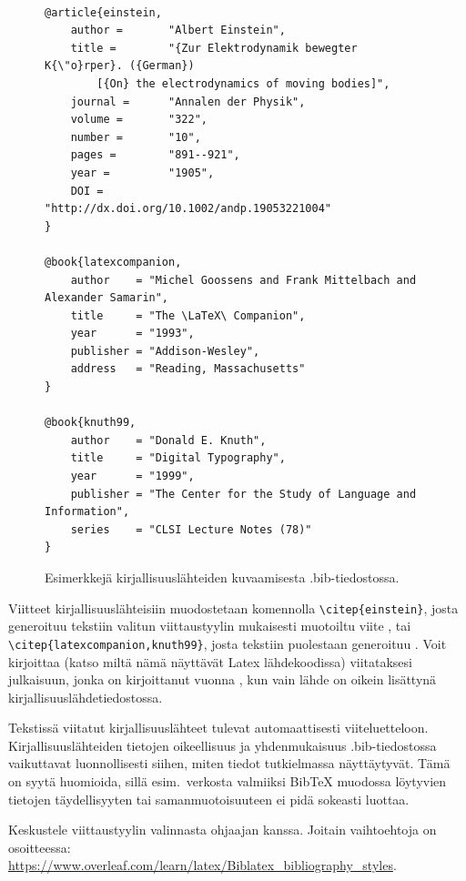 \begin{figure}[ht]
    \centering
    \begin{scriptsize}
\begin{verbatim}

@article{einstein,
    author =       "Albert Einstein",
    title =        "{Zur Elektrodynamik bewegter K{\"o}rper}. ({German})
        [{On} the electrodynamics of moving bodies]",
    journal =      "Annalen der Physik",
    volume =       "322",
    number =       "10",
    pages =        "891--921",
    year =         "1905",
    DOI =          "http://dx.doi.org/10.1002/andp.19053221004"
}

@book{latexcompanion,
    author    = "Michel Goossens and Frank Mittelbach and Alexander Samarin",
    title     = "The \LaTeX\ Companion",
    year      = "1993",
    publisher = "Addison-Wesley",
    address   = "Reading, Massachusetts"
}

@book{knuth99,
    author    = "Donald E. Knuth",
    title     = "Digital Typography",
    year      = "1999",
    publisher = "The Center for the Study of Language and Information",
    series    = "CLSI Lecture Notes (78)"
}
\end{verbatim}
\end{scriptsize}
    \caption{Esimerkkejä kirjallisuuslähteiden kuvaamisesta .bib-tiedostossa.}
    \label{bibexamples-fi}
\end{figure}

Viitteet kirjallisuuslähteisiin muodostetaan komennolla \texttt{\textbackslash citep\{einstein\}}, josta generoituu tekstiin valitun viittaustyylin mukaisesti muotoiltu viite \citep{einstein}, tai \texttt{\textbackslash citep\{latexcompanion,knuth99\}}, josta tekstiin puolestaan generoituu \citep{latexcompanion,knuth99}. 
Voit kirjoittaa (katso miltä nämä näyttävät Latex lähdekoodissa) \citep{einstein} viitataksesi julkaisuun, jonka on kirjoittanut \citeauthor{einstein} vuonna \citeyear{einstein}, kun vain lähde \citet{einstein} on oikein lisättynä kirjallisuuslähdetiedostossa.

Tekstissä viitatut kirjallisuuslähteet tulevat automaattisesti viiteluetteloon. Kirjallisuuslähteiden tietojen oikeellisuus ja yhdenmukaisuus .bib-tiedostossa vaikuttavat luonnollisesti siihen, miten tiedot tutkielmassa näyttäytyvät. Tämä on syytä huomioida, sillä esim.\ verkosta valmiiksi {Bib\TeX} muodossa löytyvien tietojen täydellisyyten tai samanmuotoisuuteen ei pidä sokeasti luottaa.  


Keskustele viittaustyylin valinnasta ohjaajan kanssa. Joitain vaihtoehtoja on osoitteessa:\\ 
\url{https://www.overleaf.com/learn/latex/Biblatex_bibliography_styles}.


